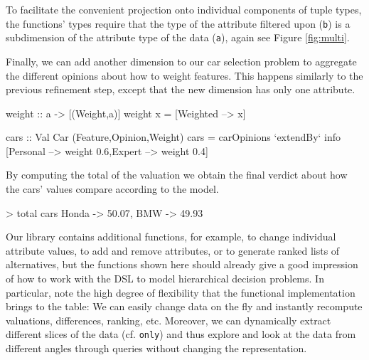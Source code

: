 \documentclass{jfp}
\newcommand{\prog}[1]{\texttt{#1}}
\begin{document}
\noindent
%
To facilitate the convenient projection onto individual components of tuple types, the functions' types require that the type of the attribute filtered upon (\prog{b}) is a subdimension of the attribute type of the data (\prog{a}), again see Figure \ref{fig:multi}.


Finally, we can add another dimension to our car selection problem to aggregate the different opinions about how to weight features. This happens similarly to the previous refinement step, except that the new dimension has only one attribute.

\begin{haskellcode}
weight :: a -> [(Weight,a)]
weight x = [Weighted --> x]

cars :: Val Car (Feature,Opinion,Weight)
cars = carOpinions `extendBy` info [Personal --> weight 0.6,Expert --> weight 0.4]
\end{haskellcode}

\noindent
%
By computing the total of the valuation we obtain the final verdict about how the cars' values compare according to the model.

\begin{haskellcode}
> total cars
{Honda -> 50.07, BMW -> 49.93}
\end{haskellcode}

\noindent
%
Our library contains additional functions, for example, to change individual attribute values, to add and remove attributes, or to generate ranked lists of alternatives, but the functions shown here should already give a good impression of how to work with the DSL to model hierarchical decision problems.
%
In particular, note the high degree of flexibility that the functional implementation brings to the table: We can easily change data on the fly and instantly recompute valuations, differences, ranking, etc. Moreover, we can dynamically extract different slices of the data (cf. \prog{only}) and thus explore and look at the data from different angles through queries without changing the representation.
\end{document}
